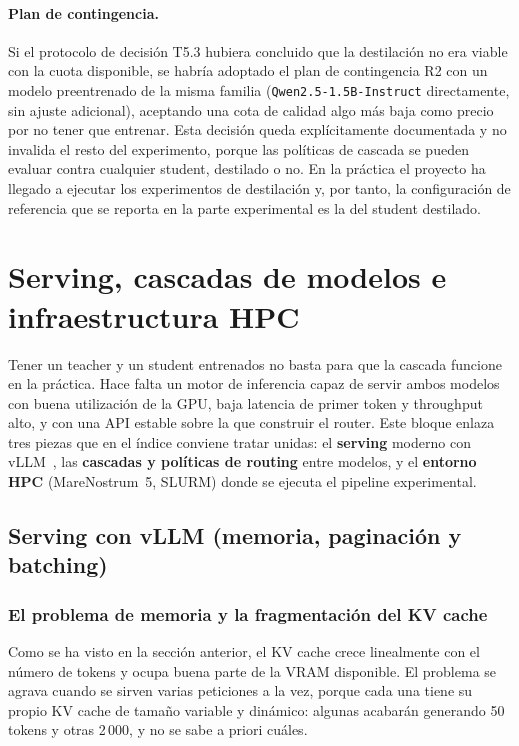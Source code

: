 \paragraph{Plan de contingencia.} Si el protocolo de decisión T5.3 hubiera concluido que la destilación no era viable con la cuota disponible, se habría adoptado el plan de contingencia R2 con un modelo preentrenado de la misma familia (\texttt{Qwen2.5-1.5B-Instruct} directamente, sin ajuste adicional), aceptando una cota de calidad algo más baja como precio por no tener que entrenar. Esta decisión queda explícitamente documentada y no invalida el resto del experimento, porque las políticas de cascada se pueden evaluar contra cualquier student, destilado o no. En la práctica el proyecto ha llegado a ejecutar los experimentos de destilación y, por tanto, la configuración de referencia que se reporta en la parte experimental es la del student destilado.

\section{Serving, cascadas de modelos e infraestructura HPC}
\label{sec:serving-teorico}

Tener un teacher y un student entrenados no basta para que la cascada funcione en la práctica. Hace falta un motor de inferencia capaz de servir ambos modelos con buena utilización de la GPU, baja latencia de primer token y throughput alto, y con una API estable sobre la que construir el router. Este bloque enlaza tres piezas que en el índice conviene tratar unidas: el \textbf{serving} moderno con vLLM~\cite{vllm2023, vllm-docs}, las \textbf{cascadas y políticas de routing} entre modelos, y el \textbf{entorno HPC} (MareNostrum~5, SLURM) donde se ejecuta el pipeline experimental.

\subsection{Serving con vLLM (memoria, paginación y batching)}

\subsubsection{El problema de memoria y la fragmentación del KV cache}

Como se ha visto en la sección anterior, el KV cache crece linealmente con el número de tokens y ocupa buena parte de la VRAM disponible. El problema se agrava cuando se sirven varias peticiones a la vez, porque cada una tiene su propio KV cache de tamaño variable y dinámico: algunas acabarán generando 50 tokens y otras 2\,000, y no se sabe a priori cuáles.

